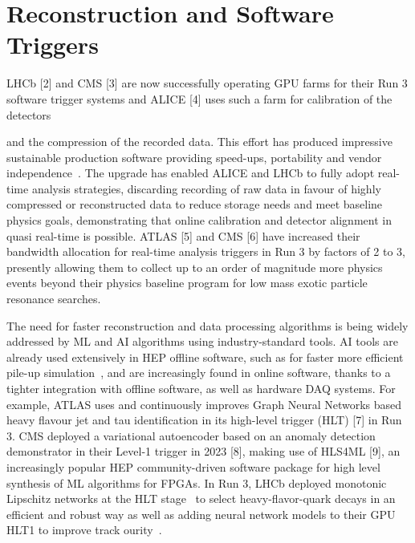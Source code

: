 \documentclass[10pt,a4paper]{article}
\begin{document}
\section{Reconstruction and Software
Triggers}\label{reconstruction-and-software-triggers}

LHCb {[}2{]} and CMS {[}3{]} are now successfully operating GPU farms
for their Run 3 software trigger systems and ALICE {[}4{]} uses such a
farm for calibration of the detectors

and the compression of the recorded data. This effort has produced
impressive sustainable production software providing speed-ups,
portability and vendor
independence~\cite{ALICE:vendorunlockedITS,LHb:Allen,MathesP3MA2017}.
The upgrade has enabled ALICE and LHCb to fully adopt real-time analysis
strategies, discarding recording of raw data in favour of highly
compressed or reconstructed data to reduce storage needs and meet
baseline physics goals, demonstrating that online calibration and
detector alignment in quasi real-time is possible. ATLAS {[}5{]} and CMS
{[}6{]} have increased their bandwidth allocation for real-time analysis
triggers in Run 3 by factors of 2 to 3, presently allowing them to
collect up to an order of magnitude more physics events beyond their
physics baseline program for low mass exotic particle resonance
searches.

The need for faster reconstruction and data processing algorithms is
being widely addressed by ML and AI algorithms using industry-standard
tools. AI tools are already used extensively in HEP offline software,
such as for faster more efficient pile-up
simulation~\cite{trackoverlay}, and are
increasingly found in online software, thanks to a tighter integration
with offline software, as well as hardware DAQ systems. For example,
ATLAS uses and continuously improves Graph Neural Networks based heavy
flavour jet and tau identification in its high-level trigger (HLT)
{[}7{]} in Run 3. CMS deployed a variational autoencoder based on an
anomaly detection demonstrator in their Level-1 trigger in 2023 {[}8{]},
making use of HLS4ML {[}9{]}, an increasingly popular HEP
community-driven software package for high level synthesis of ML
algorithms for FPGAs. In Run 3, LHCb deployed monotonic Lipschitz
networks at the HLT stage~\cite{LHCb:Lipschitz} to
select heavy-flavor-quark decays in an efficient and robust way as well
as adding neural network models to their GPU HLT1 to improve track
ourity~\cite{neuralmodelHLT1LHCb}.
\end{document}

